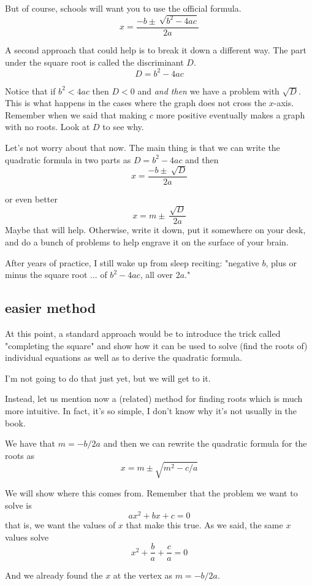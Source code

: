 \documentclass[11pt, oneside]{article}
\begin{document}
But of course, schools will want you to use the official formula.
\[ x = \frac{-b \pm \ \sqrt{b^2 - 4ac}}{2a} \]

A second approach that could help is to break it down a different way.  The part under the square root is called the discriminant $D$.
\[ D = b^2 - 4ac \]

Notice that if $b^2 < 4ac$ then $D < 0$ and \emph{and then} we have a problem with $\sqrt{D}$.  This is what happens in the cases where the graph does not cross the $x$-axis.  Remember when we said that making $c$ more positive eventually  makes a graph with no roots.  Look at $D$ to see why.

Let's not worry about that now.  The main thing is that we can write the quadratic formula in two parts as $D = b^2 - 4ac$ and then
\[ x = \frac{- b \pm \ \sqrt{D}}{2a} \]

or even better
\[ x = m \pm \ \frac{\sqrt{D}}{2a} \]
Maybe that will help.  Otherwise, write it down, put it somewhere on your desk, and do a bunch of problems to help engrave it on the surface of your brain.

After years of practice, I still wake up from sleep reciting: "negative $b$, plus or minus the square root ... of $b^2 - 4ac$, all over 2$a$."

\subsection*{easier method}

At this point, a standard approach would be to introduce the trick called "completing the square" and show how it can be used to solve (find the roots of) individual equations as well as to derive the quadratic formula.

I'm not going to do that just yet, but we will get to it.

Instead, let us mention now a (related) method for finding roots which is much more intuitive.  In fact, it's so simple, I don't know why it's not usually in the book.

We have that $m = -b/2a$ and then we can rewrite the quadratic formula for the roots as
\[ x = m \pm \sqrt{m^2 - c/a} \]

We will show where this comes from.  Remember that the problem we want to solve is
\[ ax^2 + bx + c  = 0 \]
that is, we want the values of $x$ that make this true.  As we said, the same $x$ values solve
\[ x^2 + \frac{b}{a} + \frac{c}{a} = 0 \]

And we already found the $x$ at the vertex as $m = -b/2a$.  
\end{document}
